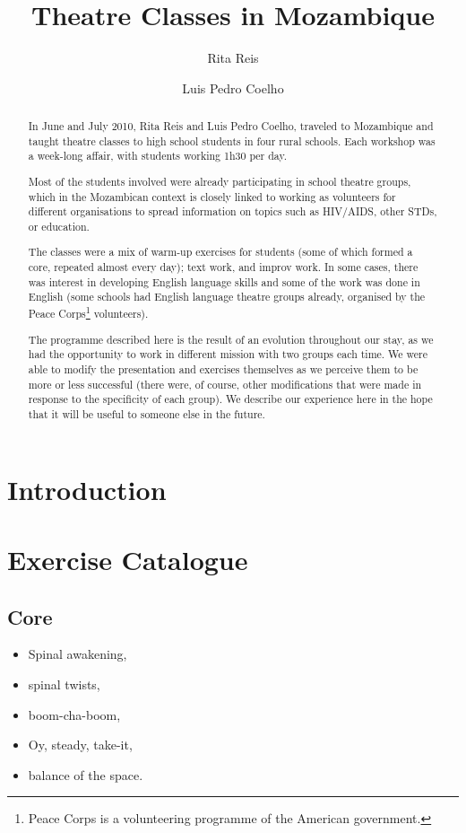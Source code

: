 \documentclass[article,twoside]{memoir}
\title{Theatre Classes in Mozambique}
\author{Rita Reis \and Luis Pedro Coelho}
\begin{document}
\begin{abstract}
In June and July 2010, Rita Reis and Luis Pedro Coelho, traveled to Mozambique
and taught theatre classes to high school students in four rural schools. Each
workshop was a week-long affair, with students working 1h30 per day.

Most of the students involved were already participating in school theatre
groups, which in the Mozambican context is closely linked to working as
volunteers for different organisations to spread information on topics such as
HIV/AIDS, other STDs, or education.

The classes were a mix of warm-up exercises for students (some of which formed
a core, repeated almost every day); text work, and improv work. In some cases,
there was interest in developing English language skills and some of the work
was done in English (some schools had English language theatre groups already,
organised by the Peace Corps\footnote{Peace Corps is a volunteering programme
of the American government.} volunteers).

The programme described here is the result of an evolution throughout our stay,
as we had the opportunity to work in different mission with two groups each
time. We were able to modify the presentation and exercises themselves as we
perceive them to be more or less successful (there were, of course, other
modifications that were made in response to the specificity of each group). We
describe our experience here in the hope that it will be useful to someone else
in the future.

\end{abstract}

\chapter{Introduction}
\chapter{Exercise Catalogue}
\section{Core}
\begin{itemize}
\item Spinal awakening,
\item spinal twists,
\item boom-cha-boom,
\item Oy, steady, take-it,
\item balance of the space.
\end{itemize}
\end{document}
